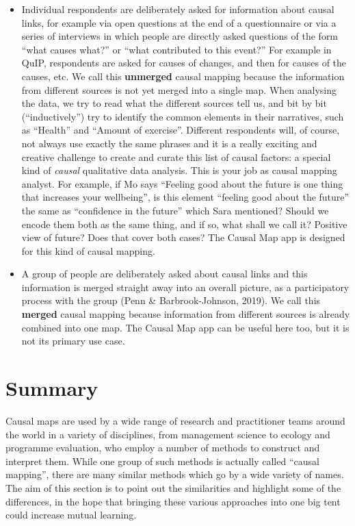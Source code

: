 \documentclass[
]{book}
\begin{document}
\begin{itemize}
\item
  Individual respondents are deliberately asked for information about causal links, for example via open questions at the end of a questionnaire or via a series of interviews in which people are directly asked questions of the form ``what causes what?'' or ``what contributed to this event?'' For example in QuIP, respondents are asked for causes of changes, and then for causes of the causes, etc. We call this \textbf{unmerged} causal mapping because the information from different sources is not yet merged into a single map. When analysing the data, we try to read what the different sources tell us, and bit by bit (``inductively'') try to identify the common elements in their narratives, such as ``Health'' and ``Amount of exercise''. Different respondents will, of course, not always use exactly the same phrases and it is a really exciting and creative challenge to create and curate this list of causal factors: a special kind of \emph{causal} qualitative data analysis. This is your job as causal mapping analyst. For example, if Mo says ``Feeling good about the future is one thing that increases your wellbeing'', is this element ``feeling good about the future'' the same as ``confidence in the future'' which Sara mentioned? Should we encode them both as the same thing, and if so, what shall we call it? Positive view of future? Does that cover both cases? The Causal Map app is designed for this kind of causal mapping.
\item
  A group of people are deliberately asked about causal links and this information is merged straight away into an overall picture, as a participatory process with the group (Penn \& Barbrook-Johnson, 2019). We call this \textbf{merged} causal mapping because information from different sources is already combined into one map. The Causal Map app can be useful here too, but it is not its primary use case.
\end{itemize}

\hypertarget{summary}{%
\section{Summary}\label{summary}}

Causal maps are used by a wide range of research and practitioner teams around the world in a variety of disciplines, from management science to ecology and programme evaluation, who employ a number of methods to construct and interpret them. While one group of such methods is actually called ``causal mapping'', there are many similar methods which go by a wide variety of names. The aim of this section is to point out the similarities and highlight some of the differences, in the hope that bringing these various approaches into one big tent could increase mutual learning.
\end{document}
